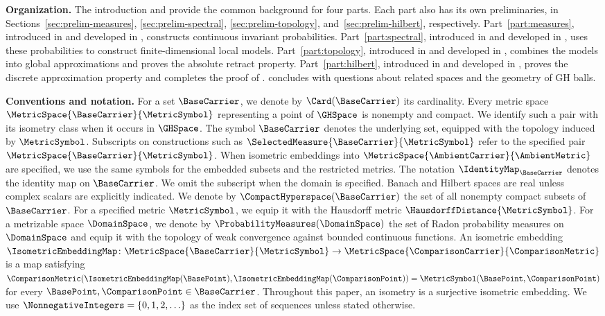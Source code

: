\medskip
\noindent\textbf{Organization.}
The introduction and
provide the common background for four parts.
Each part also has its own preliminaries,
in Sections~\ref{sec:prelim-measures},
\ref{sec:prelim-spectral},
\ref{sec:prelim-topology},
and~\ref{sec:prelim-hilbert},
respectively.
Part~\ref{part:measures},
introduced in  and developed in ,
constructs continuous invariant probabilities.
Part~\ref{part:spectral},
introduced in  and developed in ,
uses these probabilities to construct finite-dimensional local models.
Part~\ref{part:topology},
introduced in  and developed in ,
combines the models into global approximations
and proves the absolute retract property.
Part~\ref{part:hilbert},
introduced in  and developed in ,
proves the discrete approximation property and completes the proof of
.
 concludes with questions about related spaces
and the geometry of GH balls.

\medskip
\noindent\textbf{Conventions and notation.}
For a set
$\BaseCarrier$,
we denote by
$\Card(\BaseCarrier)$
its cardinality.
Every metric space
$\MetricSpace{\BaseCarrier }{\MetricSymbol }$
representing a point of
$\GHSpace$
is nonempty and compact.
We identify such a pair with its isometry class when it occurs in
$\GHSpace$.
The symbol
$\BaseCarrier $
denotes the underlying set,
equipped with the topology induced by
$\MetricSymbol $.
Subscripts on constructions such as
$\SelectedMeasure{\BaseCarrier}{\MetricSymbol}$
refer to the specified pair
$\MetricSpace{\BaseCarrier }{\MetricSymbol }$.
When isometric embeddings into
$\MetricSpace{\AmbientCarrier }{\AmbientMetric }$
are specified,
we use the same symbols for the embedded subsets and the restricted
metrics.
The notation
$\IdentityMap_{\BaseCarrier}$
denotes the identity map on
$\BaseCarrier$.
We omit the subscript when the domain is specified.
Banach and Hilbert spaces are real unless complex scalars are explicitly indicated.
We denote by
$\CompactHyperspace(\BaseCarrier )$
the set of all nonempty compact subsets of
$\BaseCarrier $.
For a specified metric
$\MetricSymbol $,
we equip it with the Hausdorff metric
$\HausdorffDistance{\MetricSymbol }$.
For a metrizable space
$\DomainSpace$,
we denote by
$\ProbabilityMeasures(\DomainSpace )$
the set of Radon probability measures on
$\DomainSpace$
and equip it with the topology of weak convergence against bounded continuous
functions.
An isometric embedding
$\IsometricEmbeddingMap \colon\MetricSpace{\BaseCarrier }{\MetricSymbol }\to\MetricSpace{\ComparisonCarrier }{\ComparisonMetric }$
is a map satisfying
$\ComparisonMetric (\IsometricEmbeddingMap (\BasePoint ),\IsometricEmbeddingMap (\ComparisonPoint ))=\MetricSymbol (\BasePoint ,\ComparisonPoint )$
for every
$\BasePoint ,\ComparisonPoint \in \BaseCarrier $.
Throughout this paper,
an isometry is a surjective isometric embedding.
We use
$\NonnegativeIntegers=\{0,1,2,\ldots\}$
as the index set of sequences unless stated otherwise.

